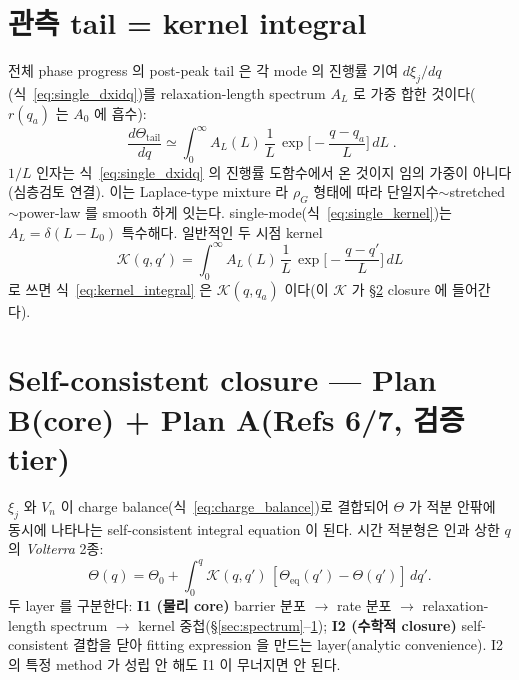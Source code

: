 \documentclass[11pt,a4paper]{article}
\newcommand{\eq}{\mathrm{eq}}
\begin{document}
\section{관측 tail = kernel integral}\label{sec:kernel}
전체 phase progress 의 post-peak tail 은 각 mode 의 진행률 기여 $d\xi_j/dq$(식~\eqref{eq:single_dxidq})를
relaxation-length spectrum $A_L$ 로 가중 합한 것이다($r(q_a)$ 는 $A_0$ 에 흡수):
\begin{equation}
\boxed{\;\frac{d\Theta_\mathrm{tail}}{dq}\simeq\int_0^\infty A_L(L)\,\frac1L\,
\exp\!\Big[-\frac{q-q_a}{L}\Big]\,dL\;.}
\label{eq:kernel_integral}
\end{equation}
$1/L$ 인자는 식~\eqref{eq:single_dxidq} 의 진행률 도함수에서 온 것이지 임의 가중이 아니다(심층검토 연결).
이는 Laplace-type mixture 라 $\rho_G$ 형태에 따라 단일지수$\sim$stretched$\sim$power-law 를 smooth 하게
잇는다. single-mode(식~\eqref{eq:single_kernel})는 $A_L=\delta(L-L_0)$ 특수해다. 일반적인 두 시점 kernel
\begin{equation}
\mathcal K(q,q')=\int_0^\infty A_L(L)\,\frac1L\,\exp\!\Big[-\frac{q-q'}{L}\Big]\,dL
\label{eq:Kdef}
\end{equation}
로 쓰면 식~\eqref{eq:kernel_integral} 은 $\mathcal K(q,q_a)$ 이다(이 $\mathcal K$ 가 \S\ref{sec:closure} closure 에 들어간다).

\section{Self-consistent closure — Plan B(core) + Plan A(Refs 6/7, 검증 tier)}\label{sec:closure}
$\xi_j$ 와 $V_n$ 이 charge balance(식~\eqref{eq:charge_balance})로 결합되어 $\Theta$ 가 적분 안팎에 동시에
나타나는 self-consistent integral equation 이 된다. 시간 적분형은 인과 상한 $q$ 의 \emph{Volterra} 2종:
\begin{equation}
\Theta(q)=\Theta_0+\int_0^q \mathcal K(q,q')\,[\Theta_\eq(q')-\Theta(q')]\,dq'.
\label{eq:volterra}
\end{equation}
두 layer 를 구분한다: \textbf{I1 (물리 core)} barrier 분포 $\to$ rate 분포 $\to$ relaxation-length
spectrum $\to$ kernel 중첩(\S\ref{sec:spectrum}--\ref{sec:kernel}); \textbf{I2 (수학적 closure)}
self-consistent 결합을 닫아 fitting expression 을 만드는 layer(analytic convenience). I2 의 특정 method 가
성립 안 해도 I1 이 무너지면 안 된다.
\end{document}
